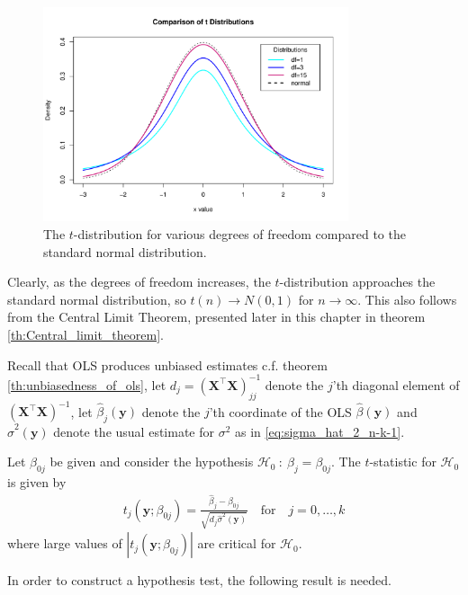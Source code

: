 \begin{figure}[H]
    \centering
    \includegraphics[width = 0.8\textwidth]{figures/t_distribution.pdf}
    \caption{The $t$-distribution for various degrees of freedom compared to the standard normal distribution.}
    \label{fig:t_distribution}
\end{figure}

Clearly, as the degrees of freedom increases, the $t$-distribution approaches the standard normal distribution, so $t(n) \rightarrow N(0,1)$ for $n\rightarrow \infty$. This also follows from the Central Limit Theorem, presented later in this chapter in theorem \ref{th:Central_limit_theorem}. 

Recall that OLS produces unbiased estimates c.f.$\!$ theorem \ref{th:unbiasedness_of_ols}, let $d_j=(\textbf{X}^\top\textbf{X})^{-1}_{jj}$ denote the $j$'th diagonal element of $(\textbf{X}^\top \textbf{X})^{-1}$, let $\hat{\beta}_j(\textbf{y})$ denote the $j$'th coordinate of the OLS $\hat{\beta}(\textbf{y})$ and $\hat{\sigma}^2(\textbf{y})$ denote the usual estimate for $\sigma^2$ as in \eqref{eq:sigma_hat_2_n-k-1}.

\begin{definition} [$t$-statistic] \label{def:t-test}
    Let $\beta_{0j}$ be given and consider the hypothesis $\mathcal{H}_0 \ : \ \beta_j=\beta_{0j}$. 
    The $t$-statistic for $\mathcal{H}_0$ is given by
\begin{align}\label{eq:t_test1}
   t_j(\textbf{y};\beta_{0j}) = \frac{\hat{\beta}_j - \beta_{0j}}{\sqrt{d_j\hat{\sigma}^2(\textbf{y})}} \quad \text{for} \quad j=0,\ldots,k
\end{align}
where large values of $|t_j(\textbf{y};\beta_{0j})|$ are critical for $\mathcal{H}_0$.
\end{definition}

In order to construct a hypothesis test, the following result is needed.

